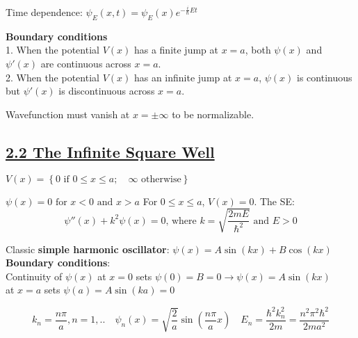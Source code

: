 Time dependence: $\psi_E(x, t) = \psi_E(x) e^{-\frac{i}{\hbar} E t}$

\textbf{Boundary conditions} \\
1. When the potential $V(x)$ has a finite jump at $x = a$, both $\psi(x)$ and $\psi'(x)$ are continuous across $x = a$. \\
2. When the potential $V(x)$ has an infinite jump at $x = a$, $\psi(x)$ is continuous but $\psi'(x)$ is discontinuous across $x = a$.

Wavefunction must vanish at $x = \pm \infty$ to be normalizable.

\subsection{\underline{2.2 The Infinite Square Well}}

$V(x) = \left\{ 0 \textrm{ if } 0 \leq x \leq a; \quad \infty \textrm{ otherwise} \right\}$


$\psi(x) = 0 \textrm{ for } x < 0 \textrm{ and } x > a$
For $0 \leq x \leq a$, $V(x) = 0$. The SE: 
    $$\psi''(x) + k^2 \psi(x) = 0 \textrm{, where } k = \sqrt{\frac{2mE}{\hbar^2}} \textrm{ and } E > 0$$

Classic \textbf{simple harmonic oscillator}: $\psi(x) = A \sin(kx) + B \cos(kx)$ \\

\textbf{Boundary conditions}: \\
Continuity of $\psi(x)$ at $x = 0$ sets $\psi(0) = B = 0 \rightarrow \psi(x) = A \sin(kx)$ \\
at $x = a$ sets $\psi(a) = A \sin(ka) = 0$

$$k_n = \frac{n \pi}{a}, n = 1,.. \quad \psi_n(x) = \sqrt{\frac{2}{a}} \sin(\frac{n \pi}{a} x) \quad E_n = \frac{\hbar^2 k_n^2}{2m} = \frac{n^2 \pi^2 \hbar^2}{2ma^2}$$



